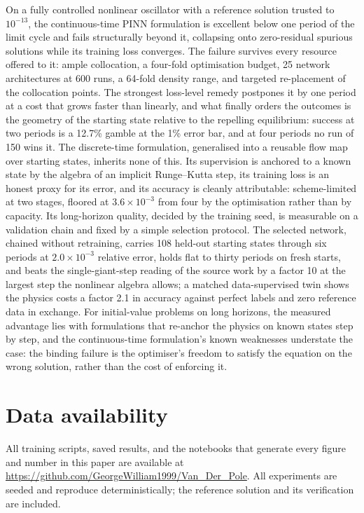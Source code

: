 \documentclass[11pt,a4paper]{article}
\begin{document}
On a fully controlled nonlinear oscillator with a reference solution
trusted to $10^{-13}$, the continuous-time PINN formulation is excellent
below one period of the limit cycle and fails structurally beyond it,
collapsing onto zero-residual spurious solutions while its training loss
converges. The failure survives every resource offered to it: ample
collocation, a four-fold optimisation budget, 25 network architectures at
600 runs, a 64-fold density range, and targeted re-placement of the
collocation points. The strongest loss-level remedy postpones it by one
period at a cost that grows faster than linearly, and what finally orders
the outcomes is the geometry of the starting state relative to the
repelling equilibrium: success at two periods is a 12.7\% gamble at the
1\% error bar, and at four periods no run of 150 wins it. The
discrete-time formulation, generalised into a reusable flow map over
starting states, inherits none of this. Its supervision is anchored to a
known state by the algebra of an implicit Runge--Kutta step, its training
loss is an honest proxy for its error, and its accuracy is cleanly
attributable: scheme-limited at two stages, floored at $3.6\times10^{-3}$
from four by the optimisation rather than by capacity. Its long-horizon
quality, decided by the training seed, is measurable on a validation
chain and fixed by a simple selection protocol. The selected network,
chained without retraining, carries 108 held-out starting states through
six periods at $2.0\times10^{-3}$ relative error, holds flat to thirty
periods on fresh starts, and beats the single-giant-step reading of the
source work by a factor 10 at the largest step the nonlinear algebra
allows; a matched data-supervised twin shows the physics costs a factor
2.1 in accuracy against perfect labels and zero reference data in
exchange. For initial-value problems on long horizons, the measured
advantage lies with formulations that re-anchor the physics on known
states step by step, and the continuous-time formulation's known
weaknesses understate the case: the binding failure is the optimiser's
freedom to satisfy the equation on the wrong solution, rather than the
cost of enforcing it.

\section*{Data availability}

All training scripts, saved results, and the notebooks that generate every
figure and number in this paper are available at
\url{https://github.com/GeorgeWilliam1999/Van_Der_Pole}. All experiments
are seeded and reproduce deterministically; the reference solution and its
verification are included.




\end{document}
